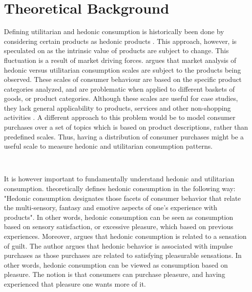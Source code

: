 \section{Theoretical Background} %
\label{sec:theoretical_background}

Defining utilitarian and hedonic consumption is historically been done by considering certain products as hedonic products \citep{crowley1992measuring}. This approach, however, is speculated on as the intrinsic value of products are subject to change. This fluctuation is a result of market driving forces. \cite{spangenberg1997measuring} argues that market analysis of hedonic versus utilitarian consumption scales are subject to the products being observed. These scales of consumer behaviour are based on the specific product categories analyzed, and are problematic when applied to different baskets of goods, or product categories. Although these scales are useful for case studies, they lack general applicability to products, services and other non-shopping activities \citep{spangenberg1997measuring}. A different approach to this problem would be to model consumer purchases over a set of topics which is based on product descriptions, rather than predefined scales. Thus, having a distribution of consumer purchases might be a useful scale to measure hedonic and utilitarian consumption patterns.

\

It is however important to fundamentally understand hedonic and utilitarian consumption. \cite{hirschman1982hedonic} theoretically defines hedonic consumption in the following way: "Hedonic consumption designates those facets of consumer behavior that relate the multi-sensory, fantasy and emotive aspects of one's experience with products". In other words, hedonic consumption can be seen as consumption based on sensory satisfaction, or excessive pleasure, which based on previous experiences. Moreover, \cite{okada2005justification} argues that hedonic consumption is related to a sensation of guilt. The author argues that hedonic behavior is associated with impulse purchases as those purchases are related to satisfying pleasurable sensations. In other words, hedonic consumption can be viewed as consumption based on pleasure. The notion is that consumers can purchase pleasure, and having experienced that pleasure one wants more of it. 

\

